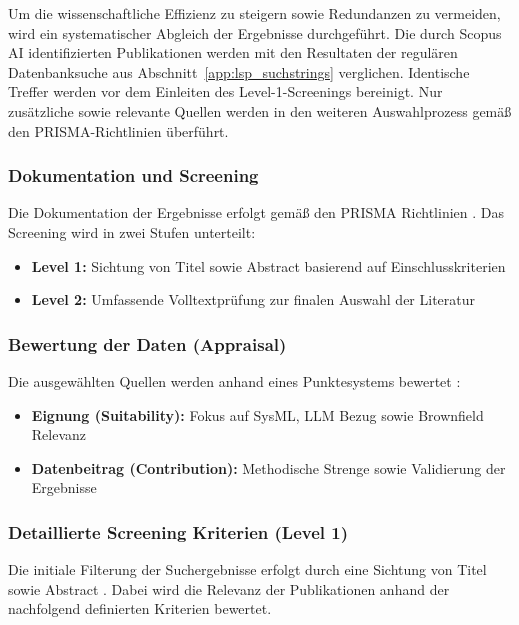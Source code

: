 Um die wissenschaftliche Effizienz zu steigern sowie Redundanzen zu vermeiden,
wird ein systematischer Abgleich der Ergebnisse durchgeführt. Die durch Scopus AI
identifizierten Publikationen werden mit den Resultaten der regulären Datenbanksuche
aus Abschnitt~\ref{app:lsp_suchstrings} verglichen. Identische Treffer werden vor dem
Einleiten des Level-1-Screenings bereinigt. Nur zusätzliche sowie relevante Quellen
werden in den weiteren Auswahlprozess gemäß den PRISMA-Richtlinien
\cite{Page.2021} überführt.

\subsubsection{Dokumentation und Screening}
Die Dokumentation der Ergebnisse erfolgt gemäß den PRISMA Richtlinien \cite{Page.2021}. Das Screening wird in zwei Stufen unterteilt:
\begin{itemize}
    \item \textbf{Level 1:} Sichtung von Titel sowie Abstract basierend auf Einschlusskriterien \cite{Higgins.2019b}
    \item \textbf{Level 2:} Umfassende Volltextprüfung zur finalen Auswahl der Literatur \cite{Higgins.2019b}
\end{itemize}
\subsubsection{Bewertung der Daten (Appraisal)}

Die ausgewählten Quellen werden anhand eines Punktesystems bewertet \cite{Balshem.2011,Guyatt.2008}:
\begin{itemize}
    \item \textbf{Eignung (Suitability):} Fokus auf SysML, LLM Bezug sowie Brownfield Relevanz
    \item \textbf{Datenbeitrag (Contribution):} Methodische Strenge sowie Validierung der Ergebnisse
\end{itemize}

\subsubsection{Detaillierte Screening Kriterien (Level 1)}

Die initiale Filterung der Suchergebnisse erfolgt durch eine Sichtung von Titel sowie Abstract \cite{Higgins.2019b}. Dabei wird die Relevanz der Publikationen anhand der nachfolgend definierten Kriterien bewertet\cite{Balshem.2011}.

